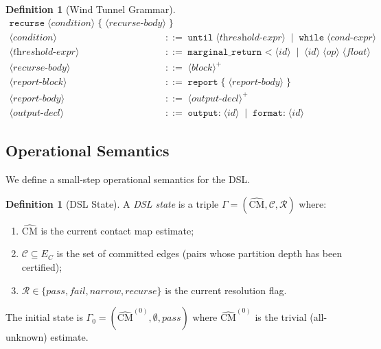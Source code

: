 \documentclass[12pt,a4paper,twocolumn]{article}
\theoremstyle{plain}
\theoremstyle{definition}
\newtheorem{definition}[theorem]{Definition}
\theoremstyle{remark}
\newcommand{\CM}{\mathrm{CM}}
\begin{document}
\begin{definition}[Wind Tunnel Grammar]
\begin{align*}
  \texttt{recurse}\;\langle\textit{condition}\rangle\;\texttt{\{}\;
  \langle\textit{recurse-body}\rangle\;\texttt{\}} \\
\langle\textit{condition}\rangle &\;::=\;
  \texttt{until}\;\langle\textit{threshold-expr}\rangle
  \;\mid\; \texttt{while}\;\langle\textit{cond-expr}\rangle \\
\langle\textit{threshold-expr}\rangle &\;::=\;
  \texttt{marginal\_return <}\;\langle\textit{id}\rangle
  \;\mid\; \langle\textit{id}\rangle\;\langle\textit{op}\rangle\;\langle\textit{float}\rangle \\
\langle\textit{recurse-body}\rangle &\;::=\;
  \langle\textit{block}\rangle^+ \\[4pt]
\langle\textit{report-block}\rangle &\;::=\;
  \texttt{report}\;\texttt{\{}\;\langle\textit{report-body}\rangle\;\texttt{\}} \\
\langle\textit{report-body}\rangle &\;::=\;
  \langle\textit{output-decl}\rangle^+ \\
\langle\textit{output-decl}\rangle &\;::=\;
  \texttt{output:}\;\langle\textit{id}\rangle
  \;\mid\; \texttt{format:}\;\langle\textit{id}\rangle
\end{align*}
\end{definition}

\subsection{Operational Semantics}

We define a small-step operational semantics for the DSL.

\begin{definition}[DSL State]
\label{def:dsl-state}
A \emph{DSL state} is a triple $\Gamma = (\hat{\CM}, \mathcal{C}, \mathcal{R})$
where:
\begin{enumerate}[label=(\roman*)]
  \item $\hat{\CM}$ is the current contact map estimate;
  \item $\mathcal{C} \subseteq E_C$ is the set of committed edges (pairs
    whose partition depth has been certified);
  \item $\mathcal{R} \in \{\textit{pass}, \textit{fail}, \textit{narrow},
    \textit{recurse}\}$ is the current resolution flag.
\end{enumerate}
The initial state is $\Gamma_0 = (\hat{\CM}^{(0)}, \emptyset, \textit{pass})$
where $\hat{\CM}^{(0)}$ is the trivial (all-unknown) estimate.
\end{definition}
\end{document}
